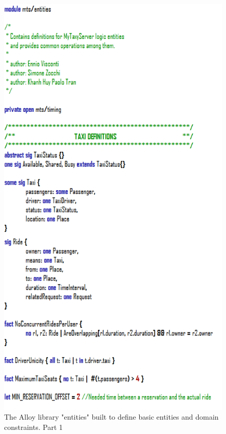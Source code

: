 \documentclass{article}
\begin{document}
\begin{figure}[h!]
        \centering
        \includegraphics[width=0.8\columnwidth]{alloy/entities1}
        \caption{The Alloy library "entities" built to define basic entities and domain constraints. Part 1}
        \label{fig:alloy-entities-1}
    \end{figure}
    
\end{document}

